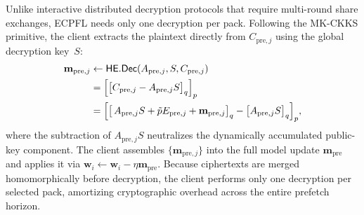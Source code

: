 Unlike interactive distributed decryption protocols that require multi-round share exchanges, \textsc{ECPFL} needs only one decryption per pack.
Following the MK-CKKS primitive, the client extracts the plaintext directly from $C_{\mathrm{pre},j}$ using the global decryption key~$S$:
\begin{equation}
\begin{aligned}
 \mathbf{m}_{\mathrm{pre},j}
& \leftarrow \mathsf{HE.Dec}(A_{\mathrm{pre},j}, S, C_{\mathrm{pre},j})\\
&= \Bigl[\bigl[ C_{\mathrm{pre},j} - A_{\mathrm{pre},j} S \bigr]_{q}\Bigr]_{p} \\
&=\Bigl[\bigl[\, A_{\mathrm{pre},j} S + \tilde{p} E_{\mathrm{pre},j} + \mathbf{m}_{\mathrm{pre},j} \bigr]_{q} - \bigl[ A_{\mathrm{pre},j} S\bigr]_q\Bigr]_p,
\end{aligned}
\label{eq:one-shot-dec}
\end{equation}
where the subtraction of $A_{\mathrm{pre},j} S$ neutralizes the dynamically accumulated public-key component.
The client assembles $\{\mathbf{m}_{\mathrm{pre},j}\}$ into the full model update $\mathbf{m}_{\mathrm{pre}}$ and applies it via $\mathbf{w}_i \leftarrow \mathbf{w}_i - \eta \mathbf{m}_{\mathrm{pre}}$.
Because ciphertexts are merged homomorphically before decryption, the client performs only one decryption per selected pack, amortizing cryptographic overhead across the entire prefetch horizon.
